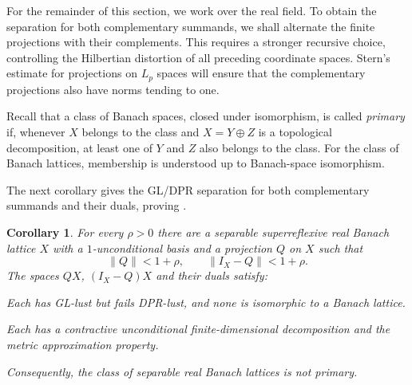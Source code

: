 \documentclass[11pt,a4paper,reqno]{amsart}
\newtheorem{corollary}[corollary]{Corollary}
\theoremstyle{definition}
\newcommand{\norm}[1]{\lVert #1\rVert}
\numberwithin{equation}{section}
\begin{document}
For the remainder of this section, we work over the real field. To obtain the separation for both complementary summands, we shall alternate the finite projections with their complements. This requires a stronger recursive choice, controlling the Hilbertian distortion of all preceding coordinate spaces. Stern's estimate for projections on $L_p$ spaces \cite{Stern2015} will ensure that the complementary projections also have norms tending to one.

Recall that a class of Banach spaces, closed under isomorphism, is called \emph{primary} if, whenever $X$ belongs to the class and $X=Y\oplus Z$ is a topological decomposition, at least one of $Y$ and $Z$ also belongs to the class. For the class of Banach lattices, membership is understood up to Banach-space isomorphism.

The next corollary gives the GL/DPR separation for both complementary summands and their duals, proving .

\begin{corollary}\label{cor:two-nonlattice-ranges}
For every $\rho>0$ there are a separable superreflexive real Banach lattice $X$ with a $1$-unconditional basis and a projection $Q$ on $X$ such that
\begin{equation*}
 \norm Q<1+\rho,\qquad \norm{I_X-Q}<1+\rho.
\end{equation*}
The spaces $QX$, $(I_X-Q)X$ and their duals satisfy:
\begin{resultparts}
\item\label{it:two-lust}
Each has GL-lust but fails DPR-lust, and none is isomorphic to a Banach lattice.
\item\label{it:two-fdd}
Each has a contractive unconditional finite-dimensional decomposition and the metric approximation property.
\end{resultparts}
Consequently, the class of separable real Banach lattices is not primary.
\end{corollary}
\end{document}
